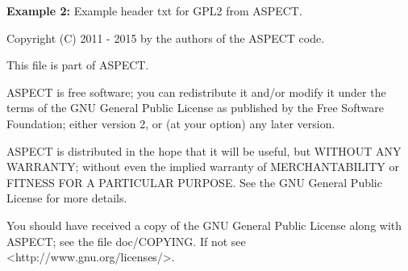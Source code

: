 \documentclass[11pt, oneside]{article}   	%
\begin{document}
\textbf{Example 2: }\newline
Example header txt for GPL2 from ASPECT.

{\selectfont
Copyright (C) 2011 - 2015 by the authors of the ASPECT code.

This file is part of ASPECT.

ASPECT is free software; you can redistribute it and/or modify\newline
it under the terms of the GNU General Public License as published by\newline
the Free Software Foundation; either version 2, or (at your option)\newline
any later version.

ASPECT is distributed in the hope that it will be useful,\newline
but WITHOUT ANY WARRANTY; without even the implied warranty of\newline
MERCHANTABILITY or FITNESS FOR A PARTICULAR PURPOSE.  See the\newline
GNU General Public License for more details.

You should have received a copy of the GNU General Public License\newline
along with ASPECT; see the file doc/COPYING.  If not see\newline
<http://www.gnu.org/licenses/>.
}
\end{document}
